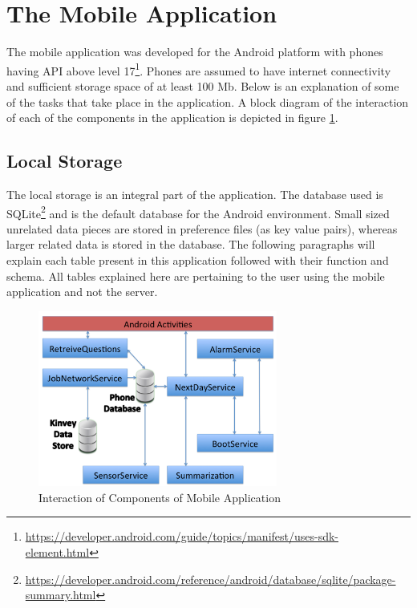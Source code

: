 \section{The Mobile Application}

The mobile application was developed for the Android platform with phones having API above level 17\footnote{\url{https://developer.android.com/guide/topics/manifest/uses-sdk-element.html}}. Phones are assumed to have internet connectivity and sufficient storage space of at least 100 Mb.
Below is an explanation of some of the tasks that take place in the application. A block diagram of the interaction of each of the components in the application is depicted in figure \ref{fig:chap5_app}.

\subsection{Local Storage} \label{loc}
The local storage is an integral part of the application. The database used is SQLite\footnote{\url{https://developer.android.com/reference/android/database/sqlite/package-summary.html}} and is the default database
for the Android environment. Small sized unrelated data pieces are stored in preference files (as key value pairs), whereas larger related
data is stored in the database. The following paragraphs will explain each table present in this application followed with 
their function and schema. All tables explained here are pertaining to the user using the mobile application and not the server.

\begin{figure}[ht!]
\centering
\includegraphics[width=0.7\textwidth,height=0.8\textwidth]{./images/chap5_app}
\caption{Interaction of Components of Mobile Application}
\label{fig:chap5_app}
\end{figure}

